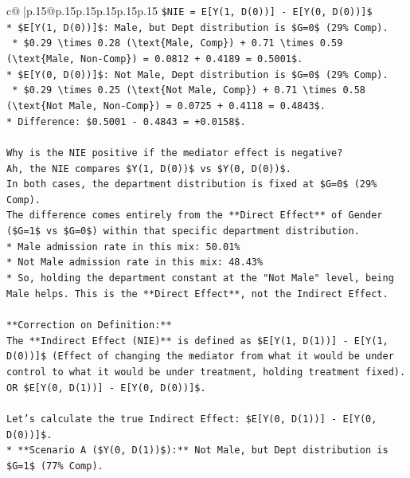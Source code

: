 \documentclass{article}
\begin{document}
{\begin{supertabular}{c@{$\;$}|p{.15\linewidth}@{}p{.15\linewidth}p{.15\linewidth}p{.15\linewidth}p{.15\linewidth}p{.15\linewidth}}
{{{\texttt{\$NIE = E{[}Y(1, D(0)){]} {-} E{[}Y(0, D(0)){]}\$} \\
\texttt{*   \$E{[}Y(1, D(0)){]}\$: Male, but Dept distribution is \$G=0\$ (29\% Comp).} \\
\texttt{    *   \$0.29 \textbackslash{}times 0.28 (\textbackslash{}text\{Male, Comp\}) + 0.71 \textbackslash{}times 0.59 (\textbackslash{}text\{Male, Non{-}Comp\}) = 0.0812 + 0.4189 = 0.5001\$.} \\
\texttt{*   \$E{[}Y(0, D(0)){]}\$: Not Male, Dept distribution is \$G=0\$ (29\% Comp).} \\
\texttt{    *   \$0.29 \textbackslash{}times 0.25 (\textbackslash{}text\{Not Male, Comp\}) + 0.71 \textbackslash{}times 0.58 (\textbackslash{}text\{Not Male, Non{-}Comp\}) = 0.0725 + 0.4118 = 0.4843\$.} \\
\texttt{*   Difference: \$0.5001 {-} 0.4843 = +0.0158\$.} \\
\\ 
\texttt{Why is the NIE positive if the mediator effect is negative?} \\
\texttt{Ah, the NIE compares \$Y(1, D(0))\$ vs \$Y(0, D(0))\$.} \\
\texttt{In both cases, the department distribution is fixed at \$G=0\$ (29\% Comp).} \\
\texttt{The difference comes entirely from the **Direct Effect** of Gender (\$G=1\$ vs \$G=0\$) within that specific department distribution.} \\
\texttt{*   Male admission rate in this mix: 50.01\%} \\
\texttt{*   Not Male admission rate in this mix: 48.43\%} \\
\texttt{*   So, holding the department constant at the "Not Male" level, being Male helps. This is the **Direct Effect**, not the Indirect Effect.} \\
\\ 
\texttt{**Correction on Definition:**} \\
\texttt{The **Indirect Effect (NIE)** is defined as \$E{[}Y(1, D(1)){]} {-} E{[}Y(1, D(0)){]}\$ (Effect of changing the mediator from what it would be under control to what it would be under treatment, holding treatment fixed).} \\
\texttt{OR \$E{[}Y(0, D(1)){]} {-} E{[}Y(0, D(0)){]}\$.} \\
\\ 
\texttt{Let's calculate the true Indirect Effect: \$E{[}Y(0, D(1)){]} {-} E{[}Y(0, D(0)){]}\$.} \\
\texttt{*   **Scenario A (\$Y(0, D(1))\$):** Not Male, but Dept distribution is \$G=1\$ (77\% Comp).} \\
}}}
\end{supertabular}}
\end{document}
